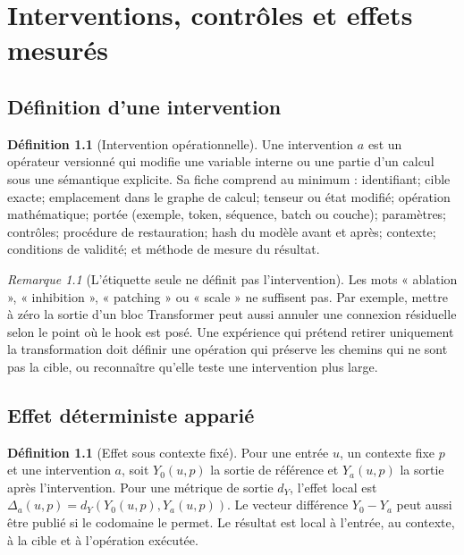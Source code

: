 \documentclass[11pt,oneside]{book}
\theoremstyle{definition}
\newtheorem{definition}[theoreme]{Définition}
\theoremstyle{remark}
\newtheorem{remarque}[theoreme]{Remarque}
\newcommand{\1}{\mathbf 1}
\begin{document}
\chapter{Interventions, contrôles et effets mesurés}
\section{Définition d'une intervention}
\begin{definition}[Intervention opérationnelle]
Une intervention $a$ est un opérateur versionné qui modifie une variable interne ou une partie d'un calcul sous une sémantique explicite. Sa fiche comprend au minimum : identifiant; cible exacte; emplacement dans le graphe de calcul; tenseur ou état modifié; opération mathématique; portée (exemple, token, séquence, batch ou couche); paramètres; contrôles; procédure de restauration; hash du modèle avant et après; contexte; conditions de validité; et méthode de mesure du résultat.
\end{definition}

\begin{remarque}[L'étiquette seule ne définit pas l'intervention]
Les mots « ablation », « inhibition », « patching » ou « scale » ne suffisent pas. Par exemple, mettre à zéro la sortie d'un bloc Transformer peut aussi annuler une connexion résiduelle selon le point où le hook est posé. Une expérience qui prétend retirer uniquement la transformation doit définir une opération qui préserve les chemins qui ne sont pas la cible, ou reconnaître qu'elle teste une intervention plus large.
\end{remarque}

\section{Effet déterministe apparié}
\begin{definition}[Effet sous contexte fixé]
Pour une entrée $u$, un contexte fixe $p$ et une intervention $a$, soit $Y_0(u,p)$ la sortie de référence et $Y_a(u,p)$ la sortie après l'intervention. Pour une métrique de sortie $d_Y$, l'effet local est $\Delta_a(u,p)=d_Y(Y_0(u,p),Y_a(u,p))$. Le vecteur différence $Y_0-Y_a$ peut aussi être publié si le codomaine le permet. Le résultat est local à l'entrée, au contexte, à la cible et à l'opération exécutée.
\end{definition}
\end{document}
